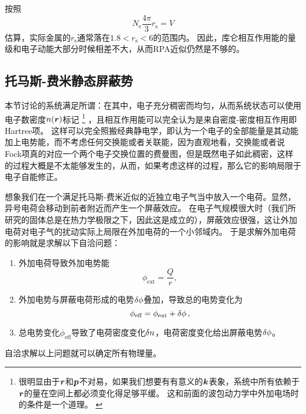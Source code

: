 按照
\[
    N_\text{e} \frac{4\pi}{3} r_\text{s} = V
\]
估算，实际金属的$r_\text{s}$通常落在$1.8 < r_\text{s} < 6$的范围内。
因此，库仑相互作用能的量级和电子动能大部分时候相差不大，从而RPA近似仍然是不够的。

\subsection{托马斯-费米静态屏蔽势}\label{sec:ext-e}

本节讨论的系统满足所谓：在其中，电子充分稠密而均匀，从而系统状态可以使用电子数密度$n(\vb*{r})$标记%
\footnote{
    很明显由于$\vb*{r}$和$\vb*{p}$不对易，如果我们想要有有意义的$\vb*{k}$表象，系统中所有依赖于$\vb*{r}$的量在空间上都必须变化得足够平缓。
    这和前面的波包动力学中外加电场时的条件是一个道理。
    \label{note:smooth-electron-distribution}
}%
，且相互作用能可以完全认为是来自密度-密度相互作用即Hartree项。
这样可以完全照搬经典静电学，即认为一个电子的全部能量是其动能加上电势能，而不考虑任何交换能或者关联能，因为直观地看，交换能或者说Fock项真的对应一个两个电子交换位置的费曼图，但是既然电子如此稠密，这样的过程大概是不太能够发生的，从而，如果考虑这样的过程，那么它的影响局限于电子自能修正。

想象我们在一个满足托马斯-费米近似的近独立电子气当中放入一个电荷。显然，异号电荷会移动到前者附近而产生一个屏蔽效应。
在电子气规模很大时（我们所研究的固体总是在热力学极限之下，因此这是成立的），屏蔽效应很强，这让外加电荷对电子气的扰动实际上局限在外加电荷的一个小邻域内。
于是求解外加电荷的影响就是求解以下自洽问题：
\begin{enumerate}
    \item 外加电荷导致外加电势能
    \begin{equation}
        \phi_\text{ext} = \frac{Q}{r},
    \end{equation}
    \item 外加电势与屏蔽电荷形成的电势$\var{\phi}$叠加，导致总的电势变化为
    \begin{equation}
        \phi_\text{eff} = \phi_\text{ext} + \var{\phi},
    \end{equation}
    \item 总电势变化$\phi_\text{eff}$导致了电荷密度变化$\var{n}$，电荷密度变化给出屏蔽电势$\var{\phi}$。
\end{enumerate}
自洽求解以上问题就可以确定所有物理量。

